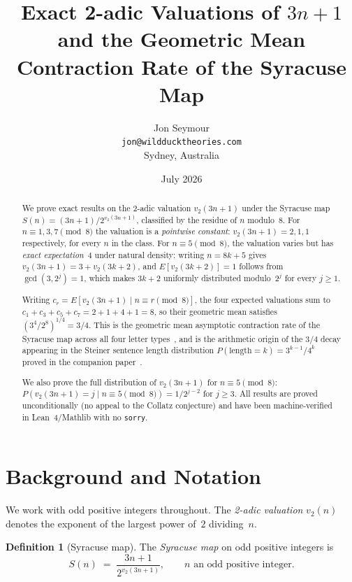 \documentclass[12pt]{article}
\title{Exact 2-adic Valuations of $3n+1$ and the Geometric Mean\\
       Contraction Rate of the Syracuse Map}
\author{Jon Seymour\\
  \texttt{jon@wildducktheories.com}\\
  Sydney, Australia}
\date{July 2026}
\theoremstyle{definition}
\newtheorem{definition}[theorem]{Definition}
\theoremstyle{remark}
\newcommand{\vt}{v_2}
\newcommand{\Sm}{S}
\begin{document}
\maketitle

\begin{abstract}
We prove exact results on the 2-adic valuation $\vt(3n+1)$ under the Syracuse
map $\Sm(n) = (3n+1)/2^{\vt(3n+1)}$, classified by the residue of $n$ modulo~8.
For $n \equiv 1, 3, 7 \pmod{8}$ the valuation is a \emph{pointwise constant}:
$\vt(3n+1) = 2, 1, 1$ respectively, for every $n$ in the class.
For $n \equiv 5 \pmod{8}$, the valuation varies but has \emph{exact expectation}~4
under natural density: writing $n = 8k+5$ gives $\vt(3n+1) = 3 + \vt(3k+2)$,
and $E[\vt(3k+2)] = 1$ follows from $\gcd(3, 2^j) = 1$, which makes $3k+2$
uniformly distributed modulo~$2^j$ for every $j \geq 1$.

Writing $c_r = E[\vt(3n+1) \mid n \equiv r \pmod{8}]$, the four expected
valuations sum to $c_1 + c_3 + c_5 + c_7 = 2 + 1 + 4 + 1 = 8$, so their
geometric mean satisfies $(3^4/2^8)^{1/4} = 3/4$.
This is the geometric mean asymptotic contraction rate of the Syracuse map
across all four letter types~\cite{terras,lagarias}, and is the arithmetic
origin of the $3/4$ decay appearing in the Steiner sentence length distribution
$P(\text{length} = k) = 3^{k-1}/4^k$ proved in the companion paper~\cite{paper67}.

We also prove the full distribution of $\vt(3n+1)$ for $n \equiv 5 \pmod{8}$:
$P(\vt(3n+1) = j \mid n \equiv 5 \pmod{8}) = 1/2^{j-2}$ for $j \geq 3$.
All results are proved unconditionally (no appeal to the Collatz conjecture)
and have been machine-verified in Lean~4/Mathlib with no \texttt{sorry}.
\end{abstract}

\tableofcontents

\section{Background and Notation}
\label{sec:background}

We work with odd positive integers throughout. The \emph{2-adic valuation}
$\vt(n)$ denotes the exponent of the largest power of~$2$ dividing~$n$.

\begin{definition}[Syracuse map]
\label{def:syracuse}
The \emph{Syracuse map} on odd positive integers is
\[
  \Sm(n) \;=\; \frac{3n+1}{2^{\vt(3n+1)}}, \qquad n \text{ an odd positive integer}.
\]
\end{definition}
\end{document}
